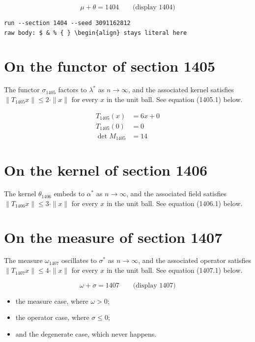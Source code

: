 \documentclass{article}
\begin{document}
$$
\mu + \theta = 1404 \qquad \text{(display 1404)}
$$

\begin{verbatim}
run --section 1404 --seed 3091162812
raw body: $ & % { } \begin{align} stays literal here
\end{verbatim}

\section{On the functor of section 1405}
The functor $\sigma_{1405}$ factors to $\lambda^{*}$ as $n \to \infty$,
and the associated kernel satisfies $\|T_{1405} x\| \leq 2 \cdot \|x\|$
for every $x$ in the unit ball. See equation (1405.1) below.

\begin{align}
T_{1405}(x) &= 6 x + 0 \\
T_{1405}(0) &= 0 \\
\det M_{1405} &= 14
\end{align}

\section{On the kernel of section 1406}
The kernel $\theta_{1406}$ embeds to $\alpha^{*}$ as $n \to \infty$,
and the associated field satisfies $\|T_{1406} x\| \leq 3 \cdot \|x\|$
for every $x$ in the unit ball. See equation (1406.1) below.

\section{On the measure of section 1407}
The measure $\omega_{1407}$ oscillates to $\sigma^{*}$ as $n \to \infty$,
and the associated operator satisfies $\|T_{1407} x\| \leq 4 \cdot \|x\|$
for every $x$ in the unit ball. See equation (1407.1) below.

$$
\omega + \sigma = 1407 \qquad \text{(display 1407)}
$$

\begin{itemize}
  \item the measure case, where $\omega > 0$;
  \item the operator case, where $\sigma \leq 0$;
  \item and the degenerate case, which never happens.
\end{itemize}
\end{document}
